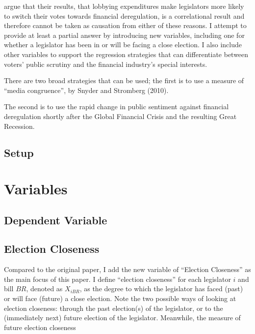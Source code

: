 \documentclass[ProjectKWK]{subfiles}
\begin{document}
\cite{IM14} argue that their results, that lobbying expenditures make legislators more likely to switch their votes towards financial deregulation, is a correlational result and therefore cannot be taken as causation from either of these reasons. I attempt to provide at least a partial answer by introducing new variables, including one for whether a legislator has been in or will be facing a close election. I also include other variables to support the regression strategies that can differentiate between voters' public scrutiny and the financial industry's special interests.

There are two broad strategies that can be used; the first is to use a measure of ``media congruence'', by Snyder and Stromberg (2010).

The second is to use the rapid change in public sentiment against financial deregulation shortly after the Global Financial Crisis and the resulting Great Recession.





\subsection{Setup}\label{subsec:Setup}





\hypertarget{Estimation Strategy}{}

\section{Variables}

\subsection{Dependent Variable}\label{subsec:DependentVariable}



\subsection{Election Closeness}\label{subsec:ElectionCloseness}

Compared to the original \cite{IM14} paper, I add the new variable of ``Election Closeness'' as the main focus of this paper. I define ``election closeness'' for each legislator $i$ and bill $BR$, denoted as $X_{iBR}$, as the degree to which the legislator has faced (past) or will face (future) a close election. Note the two possible ways of looking at election closeness: through the past election(s) of the legislator, or to the (immediately next) future election of the legislator. Meanwhile, the measure of future election closeness
\\
\end{document}
